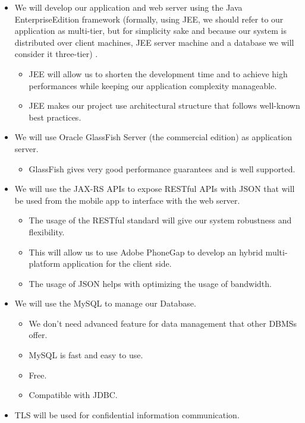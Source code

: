 \documentclass[]{article}
\providecommand{\tightlist}{%
  \setlength{\itemsep}{0pt}\setlength{\parskip}{0pt}}
\begin{document}
\begin{itemize}
\item
  We will develop our application and web server using the Java
  EnterpriseEdition framework (formally, using JEE, we should refer to
  our application as multi-tier, but for simplicity sake and because our
  system is distributed over client machines, JEE server machine and a
  database we will consider it three-tier) .

  \begin{itemize}
  \tightlist
  \item
    JEE will allow us to shorten the development time and to achieve
    high performances while keeping our application complexity
    manageable.
  \item
    JEE makes our project use architectural structure that follows
    well-known best practices.
  \end{itemize}
\item
  We will use Oracle GlassFish Server (the commercial edition) as
  application server.

  \begin{itemize}
  \tightlist
  \item
    GlassFish gives very good performance guarantees and is well
    supported.
  \end{itemize}
\item
  We will use the JAX-RS APIs to expose RESTful APIs with JSON that will
  be used from the mobile app to interface with the web server.

  \begin{itemize}
  \tightlist
  \item
    The usage of the RESTful standard will give our system robustness
    and flexibility.
  \item
    This will allow us to use Adobe PhoneGap to develop an hybrid
    multi-platform application for the client side.
  \item
    The usage of JSON helps with optimizing the usage of bandwidth.
  \end{itemize}
\item
  We will use the MySQL to manage our Database.

  \begin{itemize}
  \tightlist
  \item
    We don't need advanced feature for data management that other DBMSs
    offer.
  \item
    MySQL is fast and easy to use.
  \item
    Free.
  \item
    Compatible with JDBC.\newline
  \end{itemize}
\item
  TLS will be used for confidential information communication.
\end{itemize}
\end{document}
